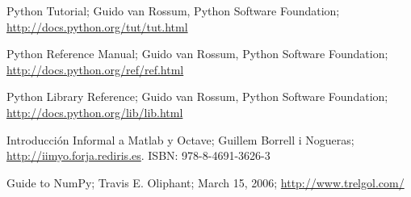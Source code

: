 \documentclass[a4paper,10pt]{article}
\begin{document}
\begin{thebibliography}{99}

  Python Tutorial; Guido van Rossum, Python Software Foundation;
  \newblock \url{http://docs.python.org/tut/tut.html}

  Python Reference Manual; Guido van Rossum, Python Software Foundation;
  \newblock \url{http://docs.python.org/ref/ref.html}

  Python Library Reference; Guido van Rossum, Python Software Foundation;
  \newblock \url{http://docs.python.org/lib/lib.html}

  Introducción Informal a Matlab y Octave; Guillem Borrell i Nogueras;
  \newblock \url{http://iimyo.forja.rediris.es}. ISBN: 978-8-4691-3626-3

  Guide to NumPy; Travis E. Oliphant; March 15, 2006;
  \newblock \url{http://www.trelgol.com/}

\end{thebibliography}
\end{document}
